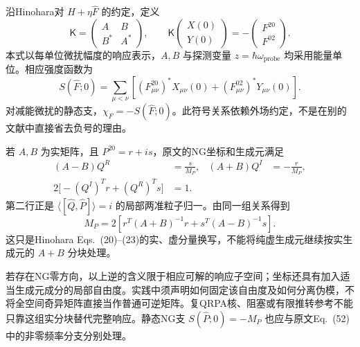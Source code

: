 沿Hinohara对 \(H+\eta\hat F\) 的约定，定义
\begin{equation}\label{eq:app-c-qrpa-kernel}
\mathsf K=
\begin{pmatrix}
A&B\\ B^*&A^*
\end{pmatrix},
\qquad
\mathsf K
\begin{pmatrix}X(0)\\Y(0)\end{pmatrix}
=-\begin{pmatrix}F^{20}\\F^{02}\end{pmatrix}.
\end{equation}
本式以每单位微扰幅度的响应表示，\(A,B\) 与探测变量 \(z=\hbar\omega_{\mathrm{probe}}\) 均采用能量单位。相应强度函数为
\begin{equation}\label{eq:app-c-strength-convention}
S(\hat F;0)=\sum_{\mu<\nu}
\left[(F^{20}_{\mu\nu})^*X_{\mu\nu}(0)
+(F^{02}_{\mu\nu})^*Y_{\mu\nu}(0)\right].
\end{equation}
对减能微扰的静态支，\(\chi_F=-S(\hat F;0)\)。此符号关系依赖外场约定，不是在别的文献中直接省去负号的理由。\cite[APS~PDF~pp.~4--5, Eqs.~(34), (41), (49)--(51)]{hinohara-2015-nambu-goldstone-inertia-response}

若 \(A,B\) 为实矩阵，且 \(P^{20}=r+i s\)，原文的NG坐标和生成元满足
\begin{equation}\label{eq:app-c-ng-local-equations}
\begin{aligned}
(A-B)Q^R&=\frac{s}{M_P},&
(A+B)Q^I&=-\frac{r}{M_P},\\
2\bigl[-(Q^I)^Tr+(Q^R)^Ts\bigr]&=1.&
\end{aligned}
\end{equation}
第二行正是 \(\langle[\hat Q,\hat P]\rangle=i\) 的局部两准粒子归一。由同一组关系得到
\begin{equation}\label{eq:app-c-ng-inertia}
M_P=2\left[
r^T(A+B)^{-1}r+s^T(A-B)^{-1}s
\right].
\end{equation}
这只是Hinohara Eqs.~(20)--(23)的实、虚分量换写，不能将纯虚生成元继续按实生成元的 \(A+B\) 分块处理。\cite[APS~PDF~p.~3, Eqs.~(20)--(23)]{hinohara-2015-nambu-goldstone-inertia-response}

若存在NG零方向，以上逆的含义限于相应可解的响应子空间；坐标还具有加入适当生成元成分的局部自由度。实践中须声明如何固定该自由度及如何分离伪模，不将全空间奇异矩阵直接当作普通可逆矩阵。复QRPA核、阻塞或有限推转参考不能只靠这组实分块替代完整响应。静态NG支 \(S(\hat P;0)=-M_P\) 也应与原文Eq.~(52)中的非零频率分支分别处理。\cite[APS~PDF~p.~5, Eqs.~(49)--(53)]{hinohara-2015-nambu-goldstone-inertia-response}

